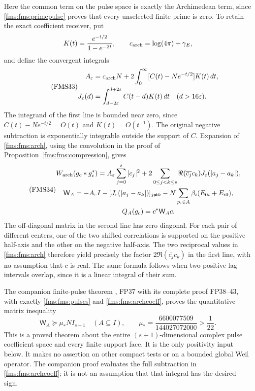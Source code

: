 \documentclass[11pt,a4paper]{article}
\theoremstyle{definition}\newtheorem{definition}[theorem]{Definition}
\begin{document}
Here the common term on the pulse space is exactly the
Archimedean term, since \eqref{fms:fms:primepulse} proves that every
unselected finite prime is zero. To retain the exact coefficient
receiver, put
\[
 K(t)=\frac{e^{-t/2}}{1-e^{-2t}},\qquad
 c_{\rm arch}=\log(4\pi)+\gamma_E,
\]
and define the convergent integrals
\begin{equation}\tag{FMS33}\label{fms:fms:archcoeff}
 \begin{split}
 A_\varepsilon
 &=c_{\rm arch}N+
       2\int_0^\infty[C(t)-Ne^{-t/2}]K(t)\,dt,\\
 J_\varepsilon(d)
 &=\int_{d-2\varepsilon}^{d+2\varepsilon}
                    C(t-d)K(t)\,dt\quad(d>16\varepsilon).
 \end{split}
\end{equation}
The integrand of the first line is bounded near zero, since
$C(t)-Ne^{-t/2}=O(t)$ and $K(t)=O(t^{-1})$.
The original negative subtraction is exponentially integrable
outside the support of $C$.
Expansion of \eqref{fms:fms:arch}, using the convolution in the proof
of Proposition~\ref{fms:fms:compression}, gives
\begin{equation}\tag{FMS34}\label{fms:fms:facecoeff}
 \begin{gathered}
 W_{\rm arch}(g_c*g_c^*)=
 A_\varepsilon\sum_{j=0}^s|c_j|^2+
       2\sum_{0\le j<k\le s}
            \Re(\overline{c_j}c_k)J_\varepsilon(|a_j-a_k|),\\
 \mathsf W_A=-A_\varepsilon I
       -[J_\varepsilon(|a_j-a_k|)]_{j\ne k}
       -N\sum_{p_i\in A}\beta_i(E_{0i}+E_{i0}),\\
 Q_A(g_c)=c^*\mathsf W_Ac.
 \end{gathered}
\end{equation}
The off-diagonal matrix in the second line has zero diagonal.
For each pair of different centers, one of the two shifted
correlations is supported on the positive half-axis and the other
on the negative half-axis. The two reciprocal values in
\eqref{fms:fms:arch} therefore yield precisely the factor
$2\Re(\overline{c_j}c_k)$ in the first line, with no assumption
that $c$ is real. The same formula follows when two positive
lag intervals overlap, since it is a linear integral of their sum.

The companion finite-pulse theorem \cite{FinitePrimePulse}, FP37 with its complete
proof FP38--43, with exactly
\eqref{fms:fms:pulses} and \eqref{fms:fms:archcoeff}, proves the quantitative
matrix inequality
\begin{equation}\tag{FMS35}\label{fms:fms:finitebound}
 \mathsf W_A\succeq\mu_*NI_{s+1}\quad(A\subseteq I),\qquad
 \mu_*=\frac{6600077509}{144027072000}>\frac1{22}.
\end{equation}
This is a proved theorem about the entire $(s+1)$-dimensional
complex pulse coefficient space and every finite support face.
It is the only positivity input below. It makes no assertion on
other compact tests or on a bounded global Weil operator.
The companion proof evaluates the full subtraction in
\eqref{fms:fms:archcoeff}; it is not an assumption that that integral
has the desired sign.
\end{document}
